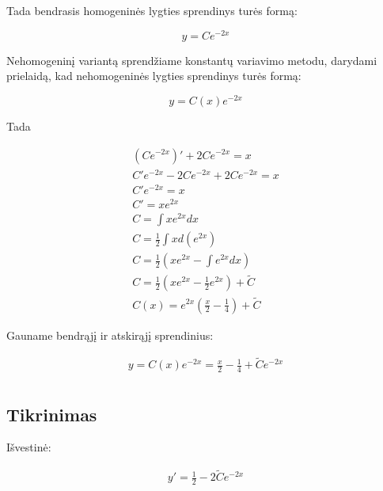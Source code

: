 \documentclass[11pt]{article}
\begin{document}
Tada bendrasis homogeninės lygties sprendinys turės formą:

\begin{equation}
y=Ce^{-2x}
\end{equation}

Nehomogeninį variantą sprendžiame konstantų variavimo metodu, darydami prielaidą, kad nehomogeninės lygties sprendinys turės formą:

\begin{equation}
    y = C(x)e^{-2x}
\end{equation}

Tada

\begin{equation}
\begin{split}
(Ce^{-2x})'+2Ce^{-2x}=x\\
C'e^{-2x}-2Ce^{-2x}+2Ce^{-2x}=x\\
C'e^{-2x}=x\\
C'=xe^{2x}\\
C=\int xe^{2x}dx\\
C=\frac{1}{2}\int xd(e^{2x})\\
C=\frac{1}{2}\left(xe^{2x}-\int e^{2x}dx\right)\\
C=\frac{1}{2}\left(xe^{2x}-\frac{1}{2}e^{2x}\right)+\widetilde{C}\\
C(x)=e^{2x}\left(\frac{x}{2}-\frac{1}{4}\right)+\widetilde{C}
\end{split}
\end{equation}

\newpage

Gauname bendrąjį ir atskirąjį sprendinius:

\begin{equation}
\begin{split}
y=C(x)e^{-2x}=\frac{x}{2}-\frac{1}{4}+\widetilde{C}e^{-2x}\\
\end{split}
\end{equation}

\subsection{Tikrinimas}

Išvestinė:

\begin{equation}
\begin{split}
y'=\frac{1}{2}-2\widetilde{C}e^{-2x}
\end{split}
\end{equation}
\end{document}
